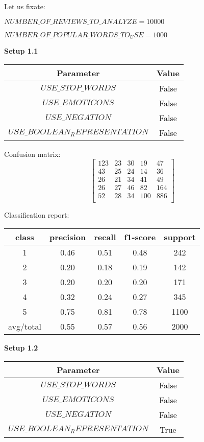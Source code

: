\documentclass[12pt]{report}
\begin{document}
Let us fixate:

$NUMBER\_OF\_REVIEWS\_TO\_ANALYZE = 10000$

$NUMBER\_OF\_POPULAR\_WORDS\_TO_USE = 1000$

\bigbreak

\textbf{Setup 1.1}

\begin{center}
	\begin{tabular}{ c | c }
		\hline
		Parameter & Value \\ \hline
		$USE\_STOP\_WORDS$ & False \\ \hline
		$USE\_EMOTICONS$ & False \\ \hline
		$USE\_NEGATION$ & False \\ \hline
		$USE\_BOOLEAN_REPRESENTATION$ & False \\ \hline
	\end{tabular}
\end{center}

Confusion matrix:
\[
\begin{bmatrix}
123 & 23 & 30 & 19 & 47 \\
43 & 25 & 24 & 14 & 36 \\
26 & 21 & 34 & 41 & 49 \\
26 & 27 & 46 & 82 & 164 \\
52 & 28 & 34 & 100 & 886 \\
\end{bmatrix}
\]

Classification report:

\begin{center}
	\begin{tabular}{c | c | c | c | c }
		\hline
		class & precision & recall & f1-score & support \\ \hline
		1 & 0.46 & 0.51 & 0.48 & 242 \\ \hline
		2 & 0.20 & 0.18 & 0.19 & 142 \\ \hline
		3 & 0.20 & 0.20 & 0.20 & 171 \\ \hline
		4 & 0.32 & 0.24 & 0.27 & 345 \\ \hline
		5 & 0.75 & 0.81 & 0.78 & 1100 \\ \hline
		avg/total & 0.55 & 0.57 & 0.56 & 2000 \\ \hline
	\end{tabular}
\end{center}



\textbf{Setup 1.2}

\begin{center}
	\begin{tabular}{ c | c }
		\hline
		Parameter & Value \\ \hline
		$USE\_STOP\_WORDS$ & False \\ \hline
		$USE\_EMOTICONS$ & False \\ \hline
		$USE\_NEGATION$ & False \\ \hline
		$USE\_BOOLEAN_REPRESENTATION$ & True \\ \hline
	\end{tabular}
\end{center}
\end{document}
